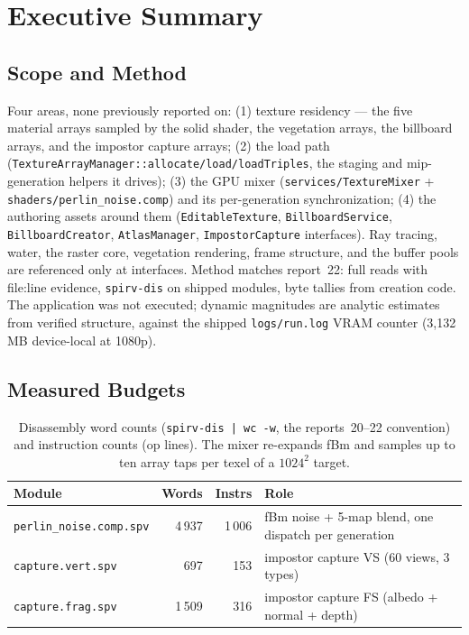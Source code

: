 \documentclass[11pt,a4paper]{article}
\begin{document}
\tableofcontents
\newpage

\section{Executive Summary}

\subsection{Scope and Method}

Four areas, none previously reported on: (1) texture residency --- the five
material arrays sampled by the solid shader, the vegetation arrays, the billboard
arrays, and the impostor capture arrays; (2) the load path
(\texttt{TextureArrayManager::allocate/load/loadTriples}, the staging and
mip-generation helpers it drives); (3) the GPU mixer
(\texttt{services/TextureMixer} + \texttt{shaders/perlin\_noise.comp}) and its
per-generation synchronization; (4) the authoring assets around them
(\texttt{EditableTexture}, \texttt{BillboardService}, \texttt{BillboardCreator},
\texttt{AtlasManager}, \texttt{ImpostorCapture} interfaces). Ray tracing,
water, the raster core, vegetation rendering, frame structure, and the buffer
pools are referenced only at interfaces. Method matches report~22: full reads
with file:line evidence, \texttt{spirv-dis} on shipped modules, byte tallies
from creation code. The application was not executed; dynamic magnitudes are
analytic estimates from verified structure, against the shipped
\texttt{logs/run.log} VRAM counter (3{,}132\,MB device-local at 1080p).

\subsection{Measured Budgets}

\begin{table}[h]
\centering
\small
\begin{tabular}{@{}lrrl@{}}
\toprule
\textbf{Module} & \textbf{Words} & \textbf{Instrs} & \textbf{Role} \\
\midrule
\texttt{perlin\_noise.comp.spv} & 4\,937 & 1\,006 & fBm noise + 5-map blend, one dispatch per generation \\
\texttt{capture.vert.spv} & 697 & 153 & impostor capture VS (60 views, 3 types) \\
\texttt{capture.frag.spv} & 1\,509 & 316 & impostor capture FS (albedo + normal + depth) \\
\bottomrule
\end{tabular}
\caption{Disassembly word counts (\texttt{spirv-dis | wc -w}, the reports~20--22
convention) and instruction counts (op lines). The mixer re-expands fBm and
samples up to ten array taps per texel of a $1024^2$ target.}
\end{table}
\end{document}
